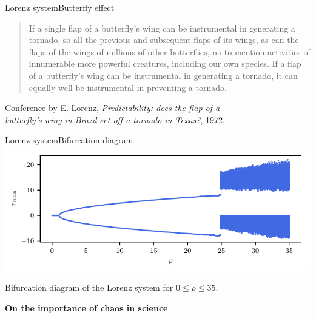 \documentclass[usenames,dvipsnames,svgnames,10pt,aspectratio=169]{beamer}
\begin{document}
\begin{frame}[t, c]{Lorenz system}{Butterfly effect}
	\begin{quote}
		If a single flap of a butterfly's wing can be instrumental in generating a tornado, so all the previous and subsequent flaps of its wings, as can the flaps of the wings of millions of other butterflies, no to mention activities of innumerable more powerful creatures, including our own species. If a flap of a butterfly's wing can be instrumental in generating a tornado, it can equally well be instrumental in preventing a tornado.
	\end{quote}

	\begin{flushright}
		Conference by E. Lorenz, \emph{Predictability: does the flap of a \\ butterfly's wing in Brazil set off a tornado in Texas?}, 1972.
	\end{flushright}

	\vspace{1cm}
\end{frame}

\begin{frame}[t, c]{Lorenz system}{Bifurcation diagram}
	\centering
	\includegraphics[width=.75\textwidth]{lorenz_bifurcation_diagram_1}

	Bifurcation diagram of the Lorenz system for $0 \leq \rho \leq 35$.
	\vspace{1cm}
\end{frame}

\begin{frame}[t, c]{}
	\centering
	\vspace{1cm}

	{\Large \textbf{On the importance of chaos in science}}

	\bigskip

	{}

\end{frame}
\end{document}
